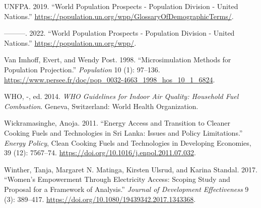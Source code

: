 \documentclass[
]{article}
\newlength{\cslhangindent}
\newlength{\cslentryspacingunit} %
\newenvironment{CSLReferences}[2] %
 {%
  \setlength{\parindent}{0pt}
  \ifodd #1
  \let\oldpar\par
  \def\par{\hangindent=\cslhangindent\oldpar}
  \fi
  \setlength{\parskip}{#2\cslentryspacingunit}
 }%
 {}
\begin{document}
\begin{CSLReferences}{1}{0}
\leavevmode{}%
UNFPA. 2019. {``World {Population} {Prospects} - {Population} {Division} - {United} {Nations}.''} \url{https://population.un.org/wpp/GlossaryOfDemographicTerms/}.

\leavevmode{}%
---------. 2022. {``World {Population} {Prospects} - {Population} {Division} - {United} {Nations}.''} \url{https://population.un.org/wpp/}.

\leavevmode{}%
Van Imhoff, Evert, and Wendy Post. 1998. {``Microsimulation Methods for Population Projection.''} \emph{Population} 10 (1): 97--136. \url{https://www.persee.fr/doc/pop_0032-4663_1998_hos_10_1_6824}.

\leavevmode{}%
WHO, -, ed. 2014. \emph{{WHO} Guidelines for Indoor Air Quality: Household Fuel Combustion}. Geneva, Switzerland: World Health Organization.

\leavevmode{}%
Wickramasinghe, Anoja. 2011. {``Energy Access and Transition to Cleaner Cooking Fuels and Technologies in {Sri} {Lanka}: {Issues} and Policy Limitations.''} \emph{Energy Policy}, Clean {Cooking} {Fuels} and {Technologies} in {Developing} {Economies}, 39 (12): 7567--74. \url{https://doi.org/10.1016/j.enpol.2011.07.032}.

\leavevmode{}%
Winther, Tanja, Margaret N. Matinga, Kirsten Ulsrud, and Karina Standal. 2017. {``Women's Empowerment Through Electricity Access: Scoping Study and Proposal for a Framework of Analysis.''} \emph{Journal of Development Effectiveness} 9 (3): 389--417. \url{https://doi.org/10.1080/19439342.2017.1343368}.

\end{CSLReferences}
\end{document}
